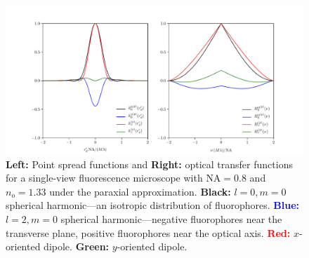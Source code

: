 \documentclass[11pt]{article}
\begin{document}
\begin{figure}[h]
 \captionsetup{width=1.0\linewidth}
 \centering
   \centering
   \includegraphics[width = 1.\textwidth]{../calculations/compare-ft/psfs.pdf}
   \caption{\textbf{Left:} Point spread functions and \textbf{Right:} optical
     transfer functions for a single-view fluorescence microscope with
     $\text{NA}=0.8$ and $n_o=1.33$ under the paraxial approximation.
     \textbf{Black:} $l=0, m=0$ spherical harmonic---an isotropic distribution
     of fluorophores. \textcolor{blue}{\textbf{Blue:}} $l=2, m=0$ spherical
     harmonic---negative fluorophores near the transverse plane, positive
     fluorophores near the optical axis. \textcolor{red}{\textbf{Red:}}
     $x$-oriented dipole. \textcolor{OliveGreen}{\textbf{Green:}} $y$-oriented
     dipole.}
   \label{fig:para}
\end{figure}
    
{}


\appendix
\end{document}
